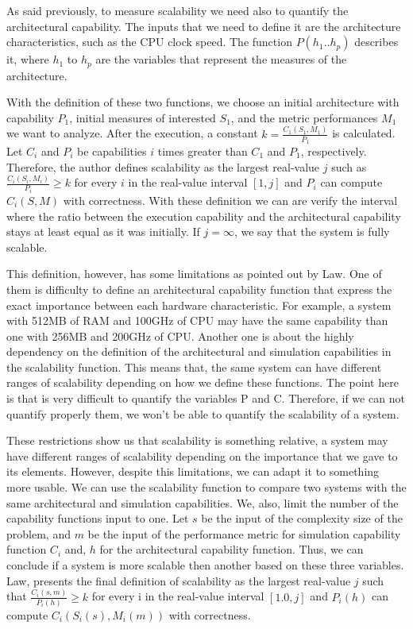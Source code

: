 As said previously, to measure scalability we need also to quantify the architectural capability. The inputs that we need to define it are the architecture characteristics, such as the CPU clock speed. The function $P(h_{1}..h_{p})$ describes it, where $h_{1}$ to $h_{p}$ are the variables that represent the measures of the architecture.

With the definition of these two functions, we choose an initial architecture with capability $P_{1}$, initial measures of interested $S_{1}$, and the metric performances $M_{1}$ we want to analyze. After the execution, a constant $k = \frac{C_{1}(S_{1},M_{1})}{P_{1}}$ is calculated. Let $C_{i}$ and $P_{i}$ be capabilities $i$ times greater than $C_{1}$ and $P_{1}$, respectively. Therefore, the author defines scalability as the largest real-value $j$ such as $\frac{C_{i}(S_{i},M_{i})}{P_{i}} \geq k$ for every $i$ in the real-value interval $[1,j]$ and $P_{i}$ can compute $C_{i}(S,M)$ with correctness. With these definition we can are verify the interval where the ratio between the execution capability and the architectural capability stays at least equal as it was initially. If $j = \infty$, we say that the system is fully scalable.

This definition, however, has some limitations as pointed out by Law. One of them is  difficulty to define an architectural capability function that express the exact importance between each hardware characteristic. For example, a system with 512MB of RAM and 100GHz of CPU may have the same capability than one with 256MB and 200GHz of CPU. Another one is about the highly dependency on the definition of the architectural and simulation capabilities in the scalability function. This means that, the same system can have different ranges of scalability depending on how we define these functions. The point here is that is very difficult to quantify the variables P and C. Therefore, if we can not quantify properly them, we won't be able to quantify the scalability of a system. 

These restrictions show us that scalability is something relative, a system may have different ranges of scalability depending on the importance that we gave to its elements. However, despite this limitations, we can adapt it to something more usable. We can use the scalability function to compare two systems with the same architectural and simulation capabilities. We, also, limit the number of the capability functions input to one. Let $s$ be the input of the complexity size of the problem, and $m$ be the input of the performance metric for simulation capability function $C_{i}$ and, $h$ for the architectural capability function. Thus, we can conclude if a system is more scalable then another based on these three variables. Law, presents the final definition of scalability as the largest real-value $j$ such that $\frac{C_{i}(s, m)}{P_{i}(h)} \geq k$ for every i in the real-value interval $[1.0, j]$ and $P_{i}(h)$ can compute $C_{i}(S_{i}(s), M_{i}(m))$ with correctness.

